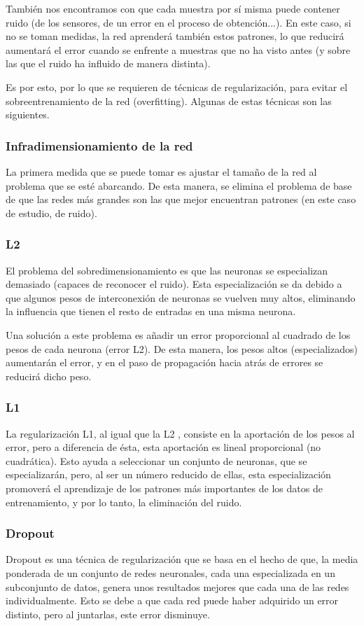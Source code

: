 También nos encontramos con que cada muestra por sí misma puede contener ruido (de los sensores, de un error en el proceso de obtención...). En este caso, si no se toman medidas, la red aprenderá también estos patrones, lo que reducirá aumentará el error cuando se enfrente a muestras que no ha visto antes (y sobre las que el ruido ha influido de manera distinta).

Es por esto, por lo que se requieren de técnicas de regularización, para evitar el sobreentrenamiento de la red (overfitting). Algunas de estas técnicas son las siguientes.

\subsubsection{Infradimensionamiento de la red}
La primera medida que se puede tomar es ajustar el tamaño de la red al problema que se esté abarcando. De esta manera, se elimina el problema de base de que las redes más grandes son las que mejor encuentran patrones (en este caso de estudio, de ruido).
\subsubsection{L2}
El problema del sobredimensionamiento es que las neuronas se especializan demasiado (capaces de reconocer el ruido). Esta especialización se da debido a que algunos pesos de interconexión de neuronas se vuelven muy altos, eliminando la influencia que tienen el resto de entradas en una misma neurona.

Una solución a este problema es añadir un error proporcional al cuadrado de los pesos de cada neurona (error L2). De esta manera, los pesos altos (especializados) aumentarán el error, y en el paso de propagación hacia atrás de errores se reducirá dicho peso.
\subsubsection{L1}
La regularización L1, al igual que la L2 \cite{ng2004feature}, consiste en la aportación de los pesos al error, pero a diferencia de ésta, esta aportación es lineal proporcional (no cuadrática). Esto ayuda a seleccionar un conjunto de neuronas, que se especializarán, pero, al ser un número reducido de ellas, esta especialización promoverá el aprendizaje de los patrones más importantes de los datos de entrenamiento, y por lo tanto, la eliminación del ruido.
\subsubsection{Dropout}
Dropout \cite{gal2015theoretically} es una técnica de regularización que se basa en el hecho de que, la media ponderada de un conjunto de redes neuronales, cada una especializada en un subconjunto de datos, genera unos resultados mejores que cada una de las redes individualmente. Esto se debe a que cada red puede haber adquirido un error distinto, pero al juntarlas, este error disminuye.

